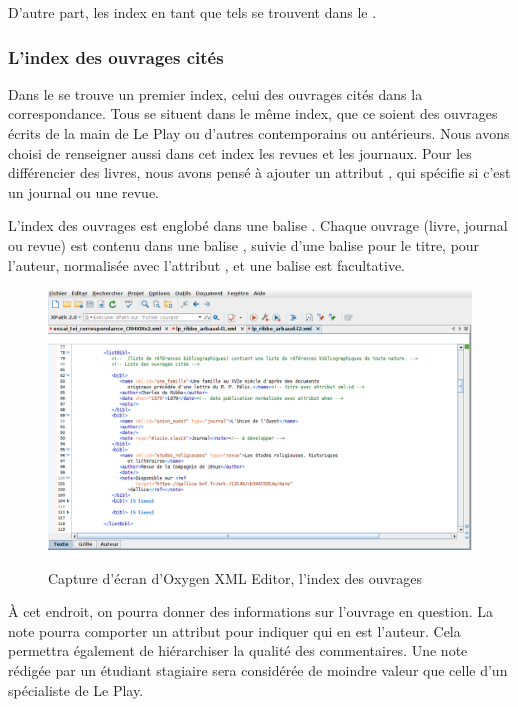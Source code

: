 D'autre part, les index en tant que tels se trouvent dans le . 

\subsubsection{L'index des ouvrages cités}

Dans le  se trouve un premier index, celui des ouvrages cités dans la correspondance. Tous se situent dans le même index, que ce soient des ouvrages écrits de la main de Le Play ou d'autres contemporains ou antérieurs. Nous avons choisi de renseigner aussi dans cet index les revues et les journaux. Pour les différencier des livres, nous avons pensé à ajouter un attribut , qui spécifie si c'est un journal ou une revue.

L'index des ouvrages est englobé dans une balise . Chaque ouvrage (livre, journal ou revue) est contenu dans une balise , suivie d'une balise  pour le titre,  pour l'auteur,  normalisée avec l'attribut , et une balise  est facultative. \begin{figure}[ht]
    \centering
    \caption{Capture d'écran d'Oxygen XML Editor, l'index des ouvrages}
    \includegraphics[width=16cm]{images/listBibl.png}
    \label{listBibl}
\end{figure}
À cet endroit, on pourra donner des informations sur l'ouvrage en question. La note pourra comporter un attribut  pour indiquer qui en est l'auteur. Cela permettra également de hiérarchiser la qualité des commentaires. Une note rédigée par un étudiant stagiaire sera considérée de moindre valeur que celle d'un spécialiste de Le Play.

